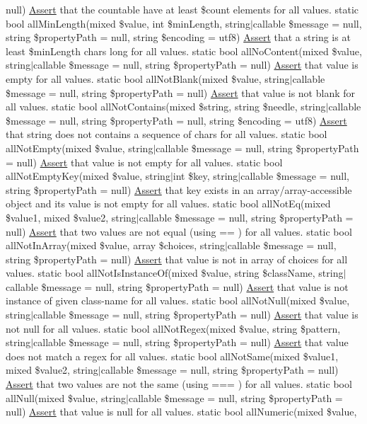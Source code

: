 null) \mbox{\hyperlink{class_assert_1_1_assert}{Assert}} that the countable have at least \$count elements for all values.  static bool all\+Min\+Length(mixed \$value, int \$min\+Length, string$\vert$callable \$message = null, string \$property\+Path = null, string \$encoding = \textquotesingle{}utf8\textquotesingle{}) \mbox{\hyperlink{class_assert_1_1_assert}{Assert}} that a string is at least \$min\+Length chars long for all values.  static bool all\+No\+Content(mixed \$value, string$\vert$callable \$message = null, string \$property\+Path = null) \mbox{\hyperlink{class_assert_1_1_assert}{Assert}} that value is empty for all values.  static bool all\+Not\+Blank(mixed \$value, string$\vert$callable \$message = null, string \$property\+Path = null) \mbox{\hyperlink{class_assert_1_1_assert}{Assert}} that value is not blank for all values.  static bool all\+Not\+Contains(mixed \$string, string \$needle, string$\vert$callable \$message = null, string \$property\+Path = null, string \$encoding = \textquotesingle{}utf8\textquotesingle{}) \mbox{\hyperlink{class_assert_1_1_assert}{Assert}} that string does not contains a sequence of chars for all values.  static bool all\+Not\+Empty(mixed \$value, string$\vert$callable \$message = null, string \$property\+Path = null) \mbox{\hyperlink{class_assert_1_1_assert}{Assert}} that value is not empty for all values.  static bool all\+Not\+Empty\+Key(mixed \$value, string$\vert$int \$key, string$\vert$callable \$message = null, string \$property\+Path = null) \mbox{\hyperlink{class_assert_1_1_assert}{Assert}} that key exists in an array/array-\/accessible object and its value is not empty for all values.  static bool all\+Not\+Eq(mixed \$value1, mixed \$value2, string$\vert$callable \$message = null, string \$property\+Path = null) \mbox{\hyperlink{class_assert_1_1_assert}{Assert}} that two values are not equal (using == ) for all values.  static bool all\+Not\+In\+Array(mixed \$value, array \$choices, string$\vert$callable \$message = null, string \$property\+Path = null) \mbox{\hyperlink{class_assert_1_1_assert}{Assert}} that value is not in array of choices for all values.  static bool all\+Not\+Is\+Instance\+Of(mixed \$value, string \$class\+Name, string$\vert$callable \$message = null, string \$property\+Path = null) \mbox{\hyperlink{class_assert_1_1_assert}{Assert}} that value is not instance of given class-\/name for all values.  static bool all\+Not\+Null(mixed \$value, string$\vert$callable \$message = null, string \$property\+Path = null) \mbox{\hyperlink{class_assert_1_1_assert}{Assert}} that value is not null for all values.  static bool all\+Not\+Regex(mixed \$value, string \$pattern, string$\vert$callable \$message = null, string \$property\+Path = null) \mbox{\hyperlink{class_assert_1_1_assert}{Assert}} that value does not match a regex for all values.  static bool all\+Not\+Same(mixed \$value1, mixed \$value2, string$\vert$callable \$message = null, string \$property\+Path = null) \mbox{\hyperlink{class_assert_1_1_assert}{Assert}} that two values are not the same (using === ) for all values.  static bool all\+Null(mixed \$value, string$\vert$callable \$message = null, string \$property\+Path = null) \mbox{\hyperlink{class_assert_1_1_assert}{Assert}} that value is null for all values.  static bool all\+Numeric(mixed \$value, 